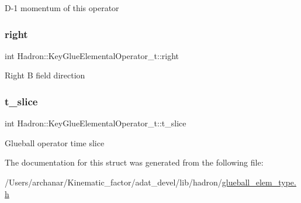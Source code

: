 D-\/1 momentum of this operator \mbox{\label{structHadron_1_1KeyGlueElementalOperator__t_a81292d0ee6bd97ac66b0f100c94b1010}} 
\subsubsection{\texorpdfstring{right}{right}}
{\footnotesize\ttfamily int Hadron\+::\+Key\+Glue\+Elemental\+Operator\+\_\+t\+::right}

Right B field direction \mbox{\label{structHadron_1_1KeyGlueElementalOperator__t_a678f4b074f03c2acbedf72f3458fbbb6}} 
\subsubsection{\texorpdfstring{t\_slice}{t\_slice}}
{\footnotesize\ttfamily int Hadron\+::\+Key\+Glue\+Elemental\+Operator\+\_\+t\+::t\+\_\+slice}

Glueball operator time slice 

The documentation for this struct was generated from the following file\+:\begin{DoxyCompactItemize}
\item 
/\+Users/archanar/\+Kinematic\+\_\+factor/adat\+\_\+devel/lib/hadron/\mbox{\hyperlink{lib_2hadron_2glueball__elem__type_8h}{glueball\+\_\+elem\+\_\+type.\+h}}\end{DoxyCompactItemize}
